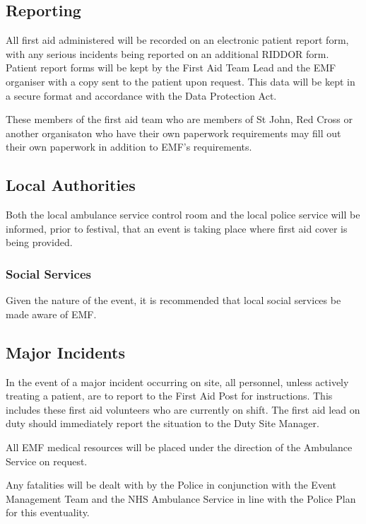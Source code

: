 \subsection{Reporting}
All first aid administered will be recorded on an electronic
patient report form, with any serious incidents being reported on an
additional RIDDOR form. Patient report forms will be kept by the First Aid Team
Lead and the EMF organiser with a copy sent to the patient upon request. This
data will be kept in a secure format and accordance with the Data Protection
Act.

These members of the first aid team who are members of St John, Red Cross or another
organisaton who have their own paperwork requirements may fill out their own paperwork
in addition to EMF's requirements.

\subsection{Local Authorities}
Both the local ambulance service control room and the local police service will
be informed, prior to festival, that an event is taking place where first aid
cover is being provided.

\subsubsection{Social Services}

Given the nature of the event, it is recommended that local social services be
made aware of EMF.

\subsection{Major Incidents}

In the event of a major incident occurring on site, all personnel, unless
actively treating a patient, are to report to the First Aid Post for
instructions. This includes these first aid volunteers who are currently on
shift. The first aid lead on duty should immediately report the situation to the
Duty Site Manager.

All EMF medical resources will be placed under the direction of the Ambulance
Service on request.

Any fatalities will be dealt with by the Police in conjunction with the Event
Management Team and the NHS Ambulance Service in line with the Police Plan for
this eventuality.
